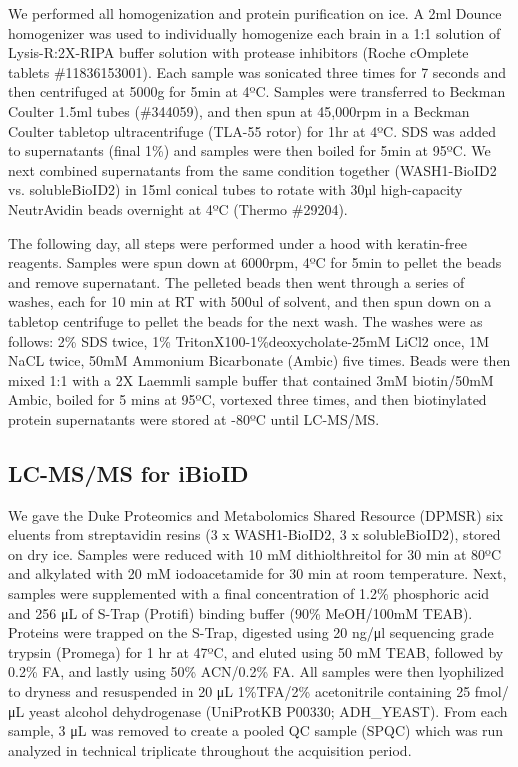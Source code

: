 We performed all homogenization and protein purification on ice. A 2ml Dounce
homogenizer was used to individually homogenize each brain in a 1:1 solution of
Lysis-R:2X-RIPA buffer solution with protease inhibitors (Roche cOmplete tablets
\#11836153001). Each sample was sonicated three times for 7 seconds and then
centrifuged at 5000g for 5min at 4ºC. Samples were transferred to Beckman
Coulter 1.5ml tubes (\#344059), and then spun at 45,000rpm in a Beckman Coulter
tabletop ultracentrifuge (TLA-55 rotor) for 1hr at 4ºC. SDS was added to
supernatants (final 1\%) and samples were then boiled for 5min at 95ºC. We next
combined supernatants from the same condition together (WASH1-BioID2 vs.
solubleBioID2) in 15ml conical tubes to rotate with 30µl high-capacity
NeutrAvidin beads overnight at 4ºC (Thermo \#29204).

The following day, all steps were performed under a hood with keratin-free
reagents. Samples were spun down at 6000rpm, 4ºC for 5min to pellet the beads
and remove supernatant. The pelleted beads then went through a series of washes,
each for 10 min at RT with 500ul of solvent, and then spun down on a tabletop
centrifuge to pellet the beads for the next wash. The washes were as follows:
2\% SDS twice, 1\% TritonX100-1\%deoxycholate-25mM LiCl2 once, 1M NaCL twice,
50mM Ammonium Bicarbonate (Ambic) five times. Beads were then mixed 1:1 with a
2X Laemmli sample buffer that contained 3mM biotin/50mM Ambic, boiled for 5 mins
at 95ºC, vortexed three times, and then biotinylated protein supernatants were
stored at -80ºC until LC-MS/MS. 

\subsection{LC-MS/MS for iBioID} We gave the Duke Proteomics and Metabolomics
Shared Resource (DPMSR) six eluents from streptavidin resins (3 x WASH1-BioID2,
3 x solubleBioID2), stored on dry ice. Samples were reduced with 10 mM
dithiolthreitol for 30 min at 80ºC and alkylated with 20 mM iodoacetamide for 30
min at room temperature. Next, samples were supplemented with a final
concentration of 1.2\% phosphoric acid and 256 μL of S-Trap (Protifi) binding
buffer (90\% MeOH/100mM TEAB). Proteins were trapped on the S-Trap, digested
using 20 ng/μl sequencing grade trypsin (Promega) for 1 hr at 47ºC, and eluted
using 50 mM TEAB, followed by 0.2\% FA, and lastly using 50\% ACN/0.2\% FA. All
samples were then lyophilized to dryness and resuspended in 20 μL 1\%TFA/2\%
acetonitrile containing 25 fmol/μL yeast alcohol dehydrogenase (UniProtKB
P00330; ADH\_YEAST). From each sample, 3 μL was removed to create a pooled QC
sample (SPQC) which was run analyzed in technical triplicate throughout the
acquisition period.

